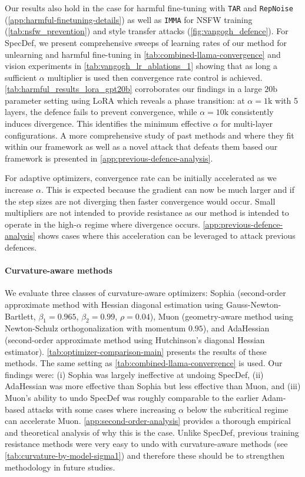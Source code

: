 \documentclass{article}
\theoremstyle{plain}
\theoremstyle{definition}
\theoremstyle{remark}
\begin{document}
Our results also hold in the case for harmful fine-tuning with \texttt{TAR} \citep{tamirisa2025tamperresistantsafeguardsopenweightllms} and \texttt{RepNoise} \citep{rosati2024representation} (\cref{app:harmful-finetuning-details}) as well as \texttt{IMMA} \citep{zheng2024imma} for NSFW training (\cref{tab:nsfw_prevention}) and style transfer attacks (\cref{fig:vangogh_defence}). For SpecDef, we present comprehensive sweeps of learning rates of our method for unlearning and harmful fine-tuning in \cref{tab:combined-llama-convergence} and vision experiments in \cref{tab:vangogh_lr_ablations_1} showing that as long a sufficient $\alpha$ multiplier is used then convergence rate control is achieved. \cref{tab:harmful_results_lora_gpt20b} corroborates our findings in a large $20\mathrm{b}$ parameter setting using LoRA which reveals a phase transition: at $\alpha=1\mathrm{k}$ with 5 layers, the defence fails to prevent convergence, while $\alpha=10\mathrm{k}$ consistently induces divergence. This identifies the minimum effective $\alpha$ for multi-layer configurations. A more comprehensive study of past methods and where they fit within our framework as well as a novel attack that defeats them based our framework is presented in \cref{app:previous-defence-analysis}.

For adaptive optimizers, convergence rate can be initially accelerated as we increase $\alpha$. This is expected because the gradient can now be much larger and if the step sizes are not diverging then faster convergence would occur. Small multipliers are not intended to provide resistance as our method is intended to operate in the high‑$\alpha$ regime where divergence occurs. \cref{app:previous-defence-analysis} shows cases where this acceleration can be leveraged to attack previous defences.

\paragraph{Curvature-aware methods} We evaluate three classes of curvature-aware optimizers: Sophia \citep{liusophia} (second-order approximate method with Hessian diagonal estimation using Gauss-Newton-Bartlett, $\beta_1=0.965$, $\beta_2=0.99$, $\rho=0.04$), Muon \citep{jordan2024muon} (geometry-aware method using Newton-Schulz orthogonalization with momentum $0.95$), and AdaHessian \citep{yao2021adahessian} (second-order approximate method using Hutchinson's diagonal Hessian estimator). \cref{tab:optimizer-comparison-main} presents the results of these methods. The same setting as \cref{tab:combined-llama-convergence} is used. Our findings were: (i) Sophia was largely ineffective at undoing SpecDef, (ii) AdaHessian was more effective than Sophia but less effective than Muon, and (iii) Muon’s ability to undo SpecDef was roughly comparable to the earlier Adam-based attacks with some cases where increasing $\alpha$  below the subcritical regime can accelerate Muon. \cref{app:second-order-analysis} provides a thorough empirical and theoretical analysis of why this is the case. Unlike SpecDef, previous training resistance methods were very easy to undo with curvature-aware methods (see \cref{tab:curvature-by-model-sigma1}) and therefore these should be to strengthen methodology in future studies.
\end{document}
